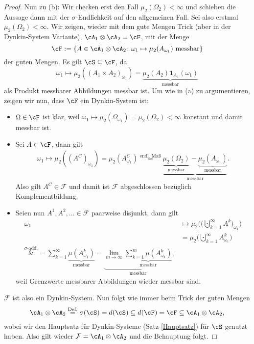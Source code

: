 \begin{proof}
	Nun zu (b): Wir checken erst den Fall $\mu_2(\Omega_2) < \infty$ und schieben die Aussage dann mit der $\sigma$-Endlichkeit auf den allgemeinen Fall. Sei also erstmal $\mu_2(\Omega_2) < \infty$. 
	 Wir zeigen, wieder mit dem gute Mengen Trick (aber in der Dynkin-System Variante), $\cA_1 \otimes \cA_2 = \cF$, mit der Menge  
	 $$\cF := \{ A \in \cA_1 \otimes \cA_2\colon \omega_1 \mapsto \mu_2(A_{\omega_1}) \text{ messbar} \}$$ der guten Mengen. Es gilt $\cS \subseteq \cF$, da \[ \omega_1\mapsto \mu_2((A_1 \times A_2)_{\omega_1}) = \underbrace{\mu_2(A_2) {\mathbf{1}_{A_1}(\omega_1)}}_{\text{messbar}}\]  als Produkt messbarer Abbildungen messbar ist. Um wie in (a) zu argumentieren, zeigen wir nun, dass $\cF$ ein Dynkin-System ist:
		\begin{itemize}
			\item $\Omega \in \cF$ ist klar, weil $\omega_1 \mapsto \mu_2(\Omega_{\omega_1}) = \mu_2(\Omega_2)<\infty$ konstant und damit messbar ist.
			\item Sei $A \in \cF$, dann gilt 
			\begin{gather*}
			\omega_1 \mapsto \mu_2((A^C)_{\omega_1}) = \mu_2(A_{\omega_1}^C) \overset{\text{endl. Maß}}{=} \underbrace{\underbrace{\mu_2(\Omega_2)}_{\text{messbar}}- \underbrace{\mu_2(A_{\omega_1})}_{\text{messbar}}}_{\text{messbar}}.
			\end{gather*}
	Also gilt $A^C\in \mathcal F$ und damit ist $\mathcal F$ abgeschlossen bez\"uglich Komplementbildung.
			\item Seien nun $A^1, A^2,... \in \mathcal F$ paarweise disjunkt, dann gilt
			\begin{align*}
			\omega_1 &\mapsto \mu_2 \Big(\Big(\bigcupdot_{k=1}^{\infty} A^k\Big)_{\omega_1}\Big)\\
			& = \mu_2 \Big(\bigcupdot_{k=1}^{\infty} A^k_{\omega_1}\Big)\\ 
			\overset{\text{$\sigma$-add.}}&{=} \sum_{k=1}^{\infty} \underbrace{\mu(A^k_{\omega_1})}_{\text{messbar}}
			= \underbrace{\lim\limits_{m \to \infty}\underbrace{\sum_{k=1}^{m} \mu(A^k_{\omega_1})}_{\text{messbar}}}_{\text{messbar}},
		\end{align*}
		weil Grenzwerte messbarer Abbildungen wieder messbar sind. 
	\end{itemize}	
	$\mathcal F$ ist also ein Dynkin-System. Nun folgt wie immer beim Trick der guten Mengen
		\begin{align*}	
			\cA_1 \otimes \cA_2 \overset{\text{Def.}}{=} \sigma(\cS) = d(\cS) \subseteq d(\cF) = \cF \subseteq \cA_1 \otimes \cA_2,
		\end{align*}
		wobei wir den Hauptsatz f\"ur Dynkin-Systeme (Satz \ref{Hauptsatz}) f\"ur $\cS$ genutzt haben. Also gilt wieder $\mathcal F=\cA_1 \otimes \cA_2$ und die Behauptung folgt.\smallskip
		

\end{proof}
